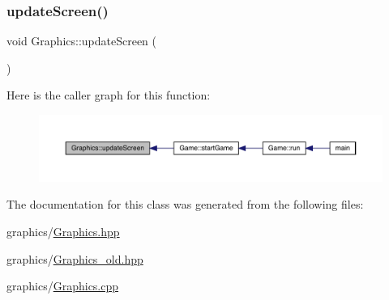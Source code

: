 \subsubsection{\texorpdfstring{update\+Screen()}{updateScreen()}}
{\footnotesize\ttfamily void Graphics\+::update\+Screen (\begin{DoxyParamCaption}{ }\end{DoxyParamCaption})}

Here is the caller graph for this function\+:\nopagebreak
\begin{figure}[H]
\begin{center}
\leavevmode
\includegraphics[width=350pt]{class_graphics_a3621b0f55951fb891a5ac2ad7dd403a0_icgraph}
\end{center}
\end{figure}


The documentation for this class was generated from the following files\+:\begin{DoxyCompactItemize}
\item 
graphics/\mbox{\hyperlink{_graphics_8hpp}{Graphics.\+hpp}}\item 
graphics/\mbox{\hyperlink{_graphics__old_8hpp}{Graphics\+\_\+old.\+hpp}}\item 
graphics/\mbox{\hyperlink{_graphics_8cpp}{Graphics.\+cpp}}\end{DoxyCompactItemize}
